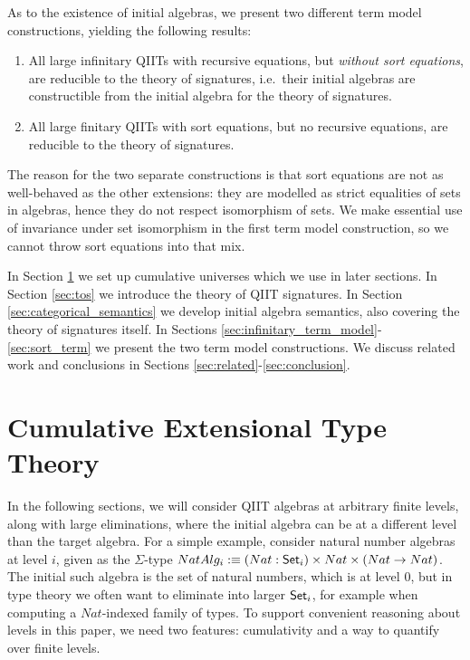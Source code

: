 \documentclass{llncs}
\begin{document}
As to the existence of initial algebras, we present two different term model
constructions, yielding the following results:

\begin{enumerate}
\item
  All large infinitary QIITs with recursive equations, but \emph{without
  sort equations}, are reducible to the theory of signatures, i.e.\
  their initial algebras are constructible from the initial algebra for
  the theory of signatures.
\item
  All large finitary QIITs with sort equations, but no recursive equations,
  are reducible to the theory of signatures.
\end{enumerate}

The reason for the two separate constructions is that sort equations are not as
well-behaved as the other extensions: they are modelled as strict equalities of
sets in algebras, hence they do not respect isomorphism of sets. We make
essential use of invariance under set isomorphism in the first term model
construction, so we cannot throw sort equations into that mix.

In Section \ref{sec:levels} we set up cumulative universes which we use in later
sections. In Section \ref{sec:tos} we introduce the theory of QIIT
signatures. In Section \ref{sec:categorical_semantics} we develop initial algebra semantics,
also covering the theory of signatures itself. In Sections
\ref{sec:infinitary_term_model}-\ref{sec:sort_term} we present the two term model
constructions. We discuss related work and conclusions in Sections
\ref{sec:related}-\ref{sec:conclusion}.


\section{Cumulative Extensional Type Theory}
\label{sec:levels}

In the following sections, we will consider QIIT algebras at arbitrary finite
levels, along with large eliminations, where the initial algebra can be at a
different level than the target algebra. For a simple example, consider natural
number algebras at level $i$, given as the $\Sigma$-type $NatAlg_i :\equiv(Nat :
\mathsf{Set}_i)\times Nat\times(Nat \rightarrow Nat)$. The initial such algebra is the set of
natural numbers, which is at level $0$, but in type theory we often want to
eliminate into larger $\mathsf{Set}_i$, for example when computing a $Nat$-indexed
family of types. To support convenient reasoning about levels in this paper, we
need two features: cumulativity and a way to quantify over finite levels.
\end{document}

